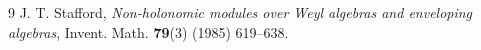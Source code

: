 \documentclass[12pt, a4paper]{amsart}
\begin{document}
\begin{thebibliography}{9}
{\sc J. T. Stafford},
{\em Non-holonomic modules over Weyl algebras and enveloping algebras},
Invent. Math. {\bf 79}(3) (1985) 619--638.

\end{thebibliography}
\end{document}
